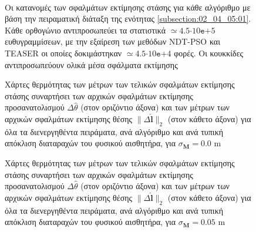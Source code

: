 \begin{figure}\centering\vspace{2cm}
  \begin{subfigure}{\linewidth}\hspace{-1cm}
    
  \end{subfigure}\\\vspace{3cm}%
  \begin{subfigure}{\linewidth}\hspace{-1cm}
    
  \end{subfigure}%
  \vspace{1cm}
\caption{\small Οι κατανομές των σφαλμάτων εκτίμησης στάσης για κάθε αλγόριθμο
         με βάση την πειραματική διάταξη της ενότητας
         \ref{subsection:02_04_05:01}. Κάθε ορθογώνιο αντιπροσωπεύει τα
         στατιστικά $\simeq 4.5$$\cdot$$10\texttt{e}$$+$$5$ ευθυγραμμίσεων, με
         την εξαίρεση των μεθόδων NDT-PSO και TEASER οι οποίες δοκιμάστηκαν
         $\simeq 4.5$$\cdot$$10\texttt{e}$$+$$4$ φορές. Οι κουκκίδες
         αντιπροσωπεύουν ολικά μέσα σφάλματα εκτίμησης}
\label{fig:02_04_05:05}
\end{figure}





\begin{figure}\vspace{1cm}\hspace{0.5cm}
  
  \vspace{1cm}
  \caption{\small Χάρτες θερμότητας των μέτρων των τελικών σφαλμάτων εκτίμησης
           στάσης συναρτήσει των αρχικών σφαλμάτων εκτίμησης προσανατολισμού
           $\Delta\hat{\theta}$ (στον οριζόντιο άξονα) και των μέτρων των
           αρχικών σφαλμάτων εκτίμησης θέσης $\|\Delta \hat{\bm{l}}\|_2$ (στον
           κάθετο άξονα) για όλα τα διενεργηθέντα πειράματα, ανά αλγόριθμο και
           ανά τυπική απόκλιση διαταραχών του φυσικού αισθητήρα, για
           $\sigma_{\bm{M}} = 0.0$ m}
  \label{fig:02_04_05:06}
\end{figure}

\begin{figure}\vspace{1cm}\hspace{0.5cm}
  
  \vspace{1cm}
  \caption{\small Χάρτες θερμότητας των μέτρων των τελικών σφαλμάτων εκτίμησης
           στάσης συναρτήσει των αρχικών σφαλμάτων εκτίμησης προσανατολισμού
           $\Delta\hat{\theta}$ (στον οριζόντιο άξονα) και των μέτρων των
           αρχικών σφαλμάτων εκτίμησης θέσης $\|\Delta \hat{\bm{l}}\|_2$ (στον
           κάθετο άξονα) για όλα τα διενεργηθέντα πειράματα, ανά αλγόριθμο και
           ανά τυπική απόκλιση διαταραχών του φυσικού αισθητήρα, για
           $\sigma_{\bm{M}} = 0.05$ m}
  \label{fig:02_04_05:07}
\end{figure}


